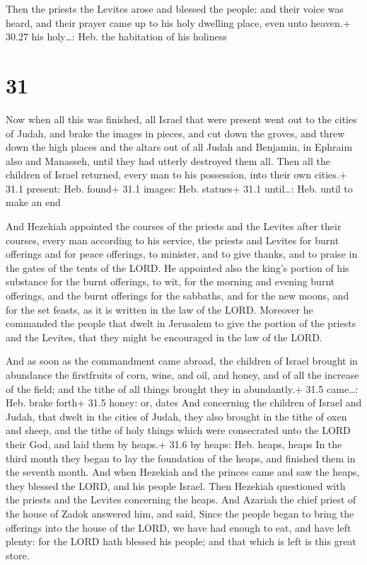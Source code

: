  Then the priests the Levites arose and blessed the
people: and their voice was heard, and their prayer came up to his holy
dwelling place, even unto heaven.+ 30.27 his holy\ldots: Heb. the
habitation of his holiness

\hypertarget{section-30}{%
\section{31}\label{section-30}}

 Now when all this was finished, all Israel that were
present went out to the cities of Judah, and brake the images in pieces,
and cut down the groves, and threw down the high places and the altars
out of all Judah and Benjamin, in Ephraim also and Manasseh, until they
had utterly destroyed them all. Then all the children of Israel
returned, every man to his possession, into their own cities.+ 31.1
present: Heb. found+ 31.1 images: Heb. statues+ 31.1 until\ldots: Heb.
until to make an end

 And Hezekiah appointed the courses of the priests and the
Levites after their courses, every man according to his service, the
priests and Levites for burnt offerings and for peace offerings, to
minister, and to give thanks, and to praise in the gates of the tents of
the LORD.  He appointed also the king's portion of his
substance for the burnt offerings, to wit, for the morning and evening
burnt offerings, and the burnt offerings for the sabbaths, and for the
new moons, and for the set feasts, as it is written in the law of the
LORD.  Moreover he commanded the people that dwelt in
Jerusalem to give the portion of the priests and the Levites, that they
might be encouraged in the law of the LORD.

 And as soon as the commandment came abroad, the children
of Israel brought in abundance the firstfruits of corn, wine, and oil,
and honey, and of all the increase of the field; and the tithe of all
things brought they in abundantly.+ 31.5 came\ldots: Heb. brake forth+
31.5 honey: or, dates  And concerning the children of Israel
and Judah, that dwelt in the cities of Judah, they also brought in the
tithe of oxen and sheep, and the tithe of holy things which were
consecrated unto the LORD their God, and laid them by heaps.+ 31.6 by
heaps: Heb. heaps, heaps  In the third month they began to
lay the foundation of the heaps, and finished them in the seventh month.
 And when Hezekiah and the princes came and saw the heaps,
they blessed the LORD, and his people Israel.  Then Hezekiah
questioned with the priests and the Levites concerning the heaps.
 And Azariah the chief priest of the house of Zadok
answered him, and said, Since the people began to bring the offerings
into the house of the LORD, we have had enough to eat, and have left
plenty: for the LORD hath blessed his people; and that which is left is
this great store.

